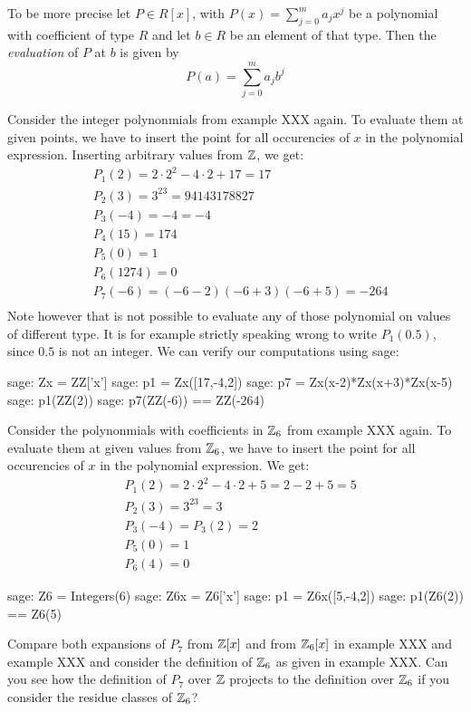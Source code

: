 To be more precise let $P\in R[x]$, with $P(x)=\sum_{j=0}^m a_j x^j$ be a polynomial with coefficient of type $R$ and let $b\in R$ be an element of that type. Then the \textit{evaluation} of $P$ at $b$ is given by
\begin{equation}
P(a) = \sum_{j=0}^m a_j b^j
\end{equation}
\begin{example}Consider the integer polynonmials from example XXX again. To evaluate them at given points, we have to insert the point for all occurencies of $x$ in the polynomial expression. Inserting arbitrary values from $\mathbb{Z}$, we get:
\begin{align*}
 &P_1(2)    = 2\cdot 2^2 -4\cdot 2 +17 = 17 \\
 &P_2(3)    = 3^{23}=94143178827 \\
 &P_3(-4)   = -4 = -4 \\
 &P_4(15)   = 174 \\
 &P_5(0)    = 1 \\
 &P_6(1274) =0 \\
 &P_7(-6)   = (-6-2)(-6+3)(-6+5) = -264 \\
\end{align*}
Note however that is not possible to evaluate any of those polynomial on values of different type. It is for example strictly speaking wrong to write $P_1(0.5)$, since $0.5$ is not an integer. We can verify our computations using sage:
\begin{sagecommandline}
sage: Zx = ZZ['x']
sage: p1 = Zx([17,-4,2])
sage: p7 = Zx(x-2)*Zx(x+3)*Zx(x-5)
sage: p1(ZZ(2))
sage: p7(ZZ(-6)) == ZZ(-264)
\end{sagecommandline}

\end{example}
\begin{example} Consider the polynonmials with coefficients in $\mathbb{Z}_6$ from example XXX again. To evaluate them at given values from $\mathbb{Z}_6$, we have to insert the point for all occurencies of $x$ in the polynomial expression. We get:
\begin{align*}
 & P_1(2)= 2\cdot 2^2 -4\cdot 2 +5 = 2 - 2 + 5 = 5\\
 &P_2(3)= 3^{23}=3\\
 &P_3(-4)= P_3(2) = 2\\
 &P_5(0)= 1\\
 &P_6(4)=0
\end{align*}
\begin{sagecommandline}
sage: Z6 = Integers(6)
sage: Z6x = Z6['x']
sage: p1 = Z6x([5,-4,2])
sage: p1(Z6(2)) == Z6(5)
\end{sagecommandline}

\end{example}
\begin{exercise}
Compare both expansions of $P_7$ from $\mathbb{Z}[x]$ and from $\mathbb{Z}_6[x]$ in example XXX and example XXX and consider the definition of $\mathbb{Z}_6$ as given in example XXX. Can you see how the definition of $P_7$ over $\mathbb{Z}$ projects to the definition over $\mathbb{Z}_6$ if you consider the residue classes of $\mathbb{Z}_6$?
\end{exercise}
